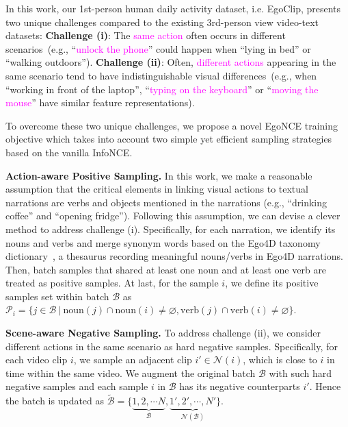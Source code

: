 \documentclass{article}
\begin{document}
In this work, our 1st-person human daily activity dataset, i.e. EgoClip, presents two unique challenges compared to the existing 3rd-person view video-text datasets: \textbf{Challenge (i)}: The \textcolor{Fuchsia}{same action} often occurs in  \textcolor{citecolor}{different scenarios}~(e.g.,  ``\textcolor{Fuchsia}{unlock the phone}'' could happen when ``\textcolor{citecolor}{lying in bed}'' or ``\textcolor{citecolor}{walking outdoors}'').
\textbf{Challenge (ii)}: Often, \textcolor{Fuchsia}{different actions} appearing in the \textcolor{citecolor}{same scenario} tend to have indistinguishable visual differences~(e.g.,  when ``\textcolor{citecolor}{working in front of the laptop}'', ``\textcolor{Fuchsia}{typing on the keyboard}'' or ``\textcolor{Fuchsia}{moving the mouse}'' have similar feature representations).

To overcome these two unique challenges, we propose a novel EgoNCE training objective which takes into account two simple yet efficient sampling strategies based on the vanilla InfoNCE.

\textbf{Action-aware Positive Sampling.}  
In this work, we make a reasonable assumption that the critical elements in linking visual actions to textual narrations are verbs and objects mentioned in the narrations (e.g., ``drinking coffee'' and ``opening fridge''). Following this assumption, we can devise a clever method to address challenge (i). 
Specifically, for each narration, we identify its nouns and verbs and merge synonym words based on the Ego4D taxonomy dictionary~\cite{grauman2021ego4d}, a thesaurus recording meaningful nouns/verbs in Ego4D narrations.
Then, batch samples that shared at least one noun and at least one verb are treated as positive samples.
At last, for the sample $i$, we define its positive samples set within batch 
$\mathcal{B}$ as $\mathcal{P}_i=\{j\in \mathcal{B}~|~\text{noun}(j)\cap\text{noun}(i)\neq\varnothing, \text{verb}(j)\cap\text{verb}(i)\neq\varnothing\}$.

\textbf{Scene-aware Negative Sampling.}
To address challenge (ii), we consider different actions in the same scenario as hard negative samples.
Specifically, for each video clip $i$, we sample an adjacent clip $i'\in \mathcal{N}(i)$, which is close to $i$ in time within the same video. 
We augment the original batch $\mathcal{B}$ with such hard negative samples and each sample $i$ in $\mathcal{B}$ has its negative counterparts $i'$.
Hence the batch is updated as $\mathcal{\widetilde{B}}=\{\underbrace{1,2,\cdots N}_{\mathcal{B}}, \underbrace{1',2',\cdots, N'}_{\mathcal{N}(\mathcal{B})} \}$. 
\end{document}
